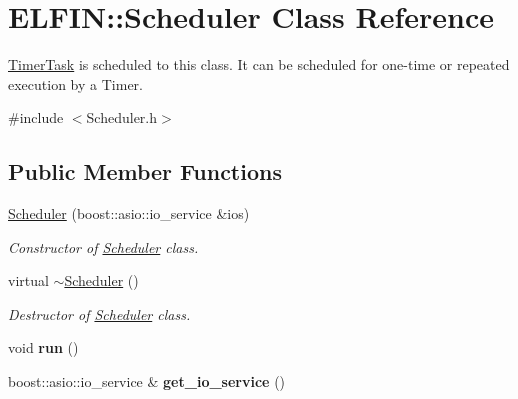 \hypertarget{class_e_l_f_i_n_1_1_scheduler}{\section{E\-L\-F\-I\-N\-:\-:Scheduler Class Reference}
\label{class_e_l_f_i_n_1_1_scheduler}
}


\hyperlink{class_e_l_f_i_n_1_1_timer_task}{Timer\-Task} is scheduled to this class. It can be scheduled for one-\/time or repeated execution by a Timer.  




{\ttfamily \#include $<$Scheduler.\-h$>$}

\subsection*{Public Member Functions}
\begin{DoxyCompactItemize}
\item 
\hyperlink{class_e_l_f_i_n_1_1_scheduler_a5f78691d533f87d51bc6ada4b7535770}{Scheduler} (boost\-::asio\-::io\-\_\-service \&ios)
\begin{DoxyCompactList}\small\item\em Constructor of \hyperlink{class_e_l_f_i_n_1_1_scheduler}{Scheduler} class. \end{DoxyCompactList}\item 
virtual \hyperlink{class_e_l_f_i_n_1_1_scheduler_aefab59f843a2d81b817516bc29338604}{$\sim$\-Scheduler} ()
\begin{DoxyCompactList}\small\item\em Destructor of \hyperlink{class_e_l_f_i_n_1_1_scheduler}{Scheduler} class. \end{DoxyCompactList}\item 
\hypertarget{class_e_l_f_i_n_1_1_scheduler_a2a85c2ab0e75916038ab2303da4f1435}{void {\bfseries run} ()}\label{class_e_l_f_i_n_1_1_scheduler_a2a85c2ab0e75916038ab2303da4f1435}

\item 
\hypertarget{class_e_l_f_i_n_1_1_scheduler_adf28778d8a1e254a19e586682b72201b}{boost\-::asio\-::io\-\_\-service \& {\bfseries get\-\_\-io\-\_\-service} ()}\label{class_e_l_f_i_n_1_1_scheduler_adf28778d8a1e254a19e586682b72201b}

\end{DoxyCompactItemize}
{\bf }\par

